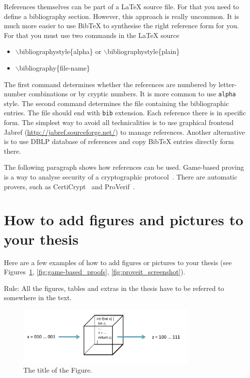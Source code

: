 \documentclass[12pt]{article}
\begin{document}
References themselves can be part of a LaTeX source file. For that you need to define a bibliography section. However, this approach is really uncommon. It is much more easier to use BibTeX to synthesise the right reference form for you. For that you must use two commands in the LaTeX source
\begin{itemize}
\item $\backslash$bibliographystyle\{alpha\} or $\backslash$bibliographystyle\{plain\}
\item $\backslash$bibliography\{file-name\}
\end{itemize}
The first command determines whether the references are numbered by letter-number combinations or by cryptic numbers. It is more common to use \texttt{alpha} style. The second command determines the file containing the bibliographic entries. The file should end with \texttt{bib} extension. Each reference there is in specific form. The simplest way to avoid all technicalities is to use graphical frontend  Jabref (\url{http://jabref.sourceforge.net/}) to manage references. Another alternative is to use DBLP database of references and copy BibTeX entries directly form there.   
    
   
The following paragraph shows how references can be used. Game-based proving is a way to analyse security of a cryptographic protocol~\cite{GameB_1, GameB_2}. There are automatic provers, such as {CertiCrypt\-}~\cite{dummy} and ProVerif~\cite{proVerif}.


\newpage
\section{How to add figures and pictures to your thesis}


Here are a few examples of how to add figures or pictures to your thesis (see Figures~\ref{fig:fnCompModel}, \ref{fig:game-based_proofs}, \ref{fig:proveit_screenshot}).

Rule: All the figures, tables and extras in the thesis have to be referred to somewhere in the text.


\begin{figure} [ht] %
\begin{center}
\includegraphics[width=0.8\textwidth]{computational_model_function}
\caption{The title of the Figure.}
\label{fig:fnCompModel}
\end{center}
\end{figure}
\end{document}
